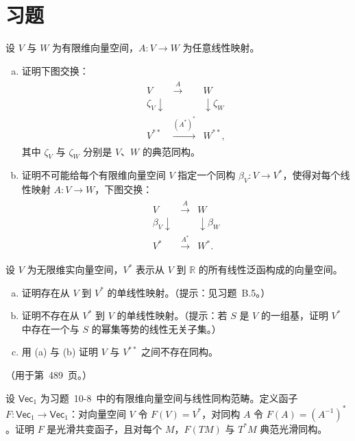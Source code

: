 \documentclass[../../main.tex]{subfiles}
\begin{document}
\section*{习题}\label{section:ch11-习题}

\begin{exercise}\label{exercise:ch11-01}
设 $V$ 与 $W$ 为有限维向量空间，$A\colon V\to W$ 为任意线性映射。
\begin{enumerate}[(a)]
\item 证明下图交换：
\begin{align*}
\begin{array}{ccc}
V & \xrightarrow{A} & W\\
\zeta_V\downarrow && \downarrow\zeta_W\\
V^{**} & \xrightarrow{(A^*)^*} & W^{**},
\end{array}
\end{align*}
其中 $\zeta_V$ 与 $\zeta_W$ 分别是 $V$、$W$ 的典范同构。
\item 证明不可能给每个有限维向量空间 $V$ 指定一个同构 $\beta_V\colon V\to V^*$，使得对每个线性映射 $A\colon V\to W$，下图交换：
\begin{align*}
\begin{array}{ccc}
V & \xrightarrow{A} & W\\
\beta_V\downarrow && \downarrow\beta_W\\
V^* & \xrightarrow{A^*} & W^*.
\end{array}
\end{align*}
\end{enumerate}
\end{exercise}

\begin{exercise}\label{exercise:ch11-02}
设 $V$ 为无限维实向量空间，$V^*$ 表示从 $V$ 到 $\mathbb{R}$ 的所有线性泛函构成的向量空间。
\begin{enumerate}[(a)]
\item 证明存在从 $V$ 到 $V^*$ 的单线性映射。（提示：见习题~B.5。）
\item 证明不存在从 $V^*$ 到 $V$ 的单线性映射。（提示：若 $S$ 是 $V$ 的一组基，证明 $V^*$ 中存在一个与 $S$ 的幂集等势的线性无关子集。）
\item 用 (a) 与 (b) 证明 $V$ 与 $V^{**}$ 之间不存在同构。
\end{enumerate}
（用于第~489~页。）
\end{exercise}

\begin{exercise}\label{exercise:ch11-03}
设 $\mathsf{Vec}_1$ 为习题~10-8~中的有限维向量空间与线性同构范畴。定义函子 $F\colon\mathsf{Vec}_1\to\mathsf{Vec}_1$：对向量空间 $V$ 令 $F(V)=V^*$，对同构 $A$ 令 $F(A)=(A^{-1})^*$。证明 $F$ 是光滑共变函子，且对每个 $M$，$F(TM)$ 与 $T^*M$ 典范光滑同构。
\end{exercise}
\end{document}
